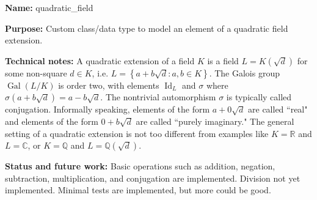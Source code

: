 \documentclass[12pt]{article}
\newcommand{\Q}{\mathbb{Q}}
\newcommand{\R}{\mathbb{R}}
\newcommand{\C}{\mathbb{C}}
\newcommand{\sig}{\sigma}
\newcommand{\lb}{\left\{}
\newcommand{\rb}{\right\}}
\newcommand{\tbf}{\textbf}
\DeclareMathOperator{\Gal}{Gal}
\DeclareMathOperator{\Id}{Id}
\begin{document}
\begin{mdframed}[linecolor=blue]
\tbf{Name:} quadratic\_field

\smallskip

\tbf{Purpose:} Custom class/data type to model an element of a quadratic field extension. 

\smallskip

\tbf{Technical notes:} A quadratic extension of a field $K$ is a field $L = K(\sqrt{d})$ for some non-square $d \in K$, i.e. $L = \lb a + b \sqrt{d} : a, b \in K \rb$. The Galois group $\Gal(L/K)$ is order two, with elements $\Id_L$ and $\sig$ where $\sig(a+b\sqrt{d}) = a - b \sqrt{d}$. The nontrivial automorphism $\sig$ is typically called conjugation. Informally speaking, elements of the form $a+0\sqrt{d}$ are called ``real" and elements of the form $0+b\sqrt{d}$ are called ``purely imaginary." The general setting of a quadratic extension is not too different from examples like $K=\R$ and $L = \C$, or $K = \Q$ and $L = \Q(\sqrt{d})$.

\smallskip

\tbf{Status and future work:} Basic operations such as addition, negation, subtraction, multiplication, and conjugation are implemented. Division not yet implemented. Minimal tests are implemented, but more could be good.

\end{mdframed}

%
%

\newpage
\end{document}
